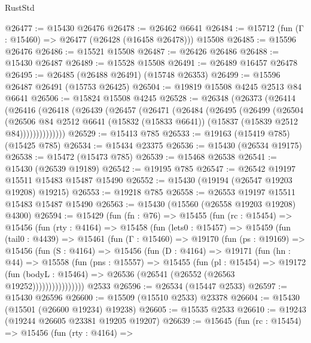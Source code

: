 \begin{lexlean}{RustStd}
\begin{coremodule}
@26477 := @15430 @26476
@26478 := @26462 @6641
@26484 := @15712 (fun (Γ : @15460) => @26477 (@26428 (@16458 @26478))) @15508
@26485 := @15596 @26476
@26486 := @15521 @15508
@26487 := @26426 @26486
@26488 := @15430 @26487
@26489 := @15528 @15508
@26491 := @26489 @16457 @26478
@26495 := @26485 (@26488 @26491) (@15748 @26353)
@26499 := @15596 @26487 @26491 (@15753 @26425)
@26504 := @19819 @15508 @4245 @2513 @84 @6641
@26506 := @15824 @15508 @4245
@26528 := @26348
    (@26373
      (@26414
        (@26416
          (@26418
            (@26439
              (@26457
                (@26471
                  (@26484
                    (@26495
                      (@26499
                        (@26504
                          (@26506
                            @84
                            @2512
                            @6641
                            (@15832 (@15833 @6641))
                            (@15837 (@15839 @2512 @84))))))))))))))
@26529 := @15413 @785
@26533 := @19163 (@15419 @785) (@15425 @785)
@26534 := @15434 @23375
@26536 := @15430 (@26534 @19175)
@26538 := @15472 (@15473 @785)
@26539 := @15468 @26538
@26541 := @15430 (@26539 @19189)
@26542 := @19195 @785
@26547 := @26542 @19197 @15511 @15483 @15487 @15490
@26552 := @15430 (@19194 (@26547 @19203 @19208) @19215)
@26553 := @19218 @785
@26558 := @26553 @19197 @15511 @15483 @15487 @15490
@26563 := @15430 (@15560 (@26558 @19203 @19208) @4300)
@26594 := @15429
    (fun (fn : @76) =>
    @15455
      (fun (rc : @15454) =>
      @15456
        (fun (rty : @4164) =>
        @15458
          (fun (lets0 : @15457) =>
          @15459
            (fun (tail0 : @4439) =>
            @15461
              (fun (Γ : @15460) =>
              @19170
                (fun (ps : @19169) =>
                @15456
                  (fun (S : @4164) =>
                  @15456
                    (fun (D : @4164) =>
                    @19171
                      (fun (hn : @44) =>
                      @15558
                        (fun (pns : @15557) =>
                        @15455
                          (fun (pl : @15454) =>
                          @19172
                            (fun (bodyL : @15464) =>
                            @26536 (@26541 (@26552 (@26563 @19252))))))))))))))))
    @2533
@26596 := @26534 (@15447 @2533)
@26597 := @15430 @26596
@26600 := @15509 (@15510 @2533) @23378
@26604 := @15430 (@15501 (@26600 @19234) @19238)
@26605 := @15535 @2533
@26610 := @19243 (@19244 @26605 @23381 @19205 @19207)
@26639 := @15645
    (fun (rc : @15454) =>
    @15456
      (fun (rty : @4164) =>

\end{coremodule}
\end{lexlean}
